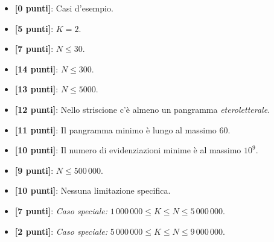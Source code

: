 \begin{itemize}[nolistsep,itemsep=2mm]
  \item \textbf{ [\phantom{1}0 punti]}: Casi d'esempio.
  \item \textbf{ [\phantom{1}5 punti]}: $K = 2$.
  \item \textbf{ [\phantom{1}7 punti]}: $N \le 30$.
  \item \textbf{ [14           punti]}: $N \le 300$.
  \item \textbf{ [13           punti]}: $N \le 5000$.
  \item \textbf{ [12           punti]}: Nello striscione c'è almeno un pangramma \textit{eteroletterale}.
  \item \textbf{ [11           punti]}: Il pangramma minimo è lungo al massimo $60$.
  \item \textbf{ [10           punti]}: Il numero di evidenziazioni minime è al massimo $10^9$.
  \item \textbf{ [\phantom{1}9 punti]}: $N \le 500\,000$.
  \item \textbf{ [10           punti]}: Nessuna limitazione specifica.
  \item \textbf{ [\phantom{1}7 punti]}: \emph{Caso speciale:} $1\,000\,000 \le K \le N \le 5\,000\,000$.
  \item \textbf{ [\phantom{1}2 punti]}: \emph{Caso speciale:} $5\,000\,000 \le K \le N \le 9\,000\,000$.
\end{itemize}



\Examples

\begin{example}
%
%
%
%
\end{example}

